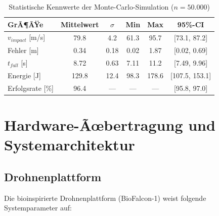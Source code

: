 ﻿\documentclass[12pt,a4paper]{article}
\theoremstyle{remark}
\begin{document}
	\begin{table}[H]
		\centering
		\caption{Statistische Kennwerte der Monte-Carlo-Simulation ($n = 50.000$)}
		\label{tab:statistik}
		\begin{tabular}{lccccc}
			\toprule
			\textbf{GrÃ¶ÃŸe} & \textbf{Mittelwert} & \textbf{$\sigma$} & \textbf{Min} & \textbf{Max} & \textbf{95\%-CI} \\
			\midrule
			$v_{impact}$ [m/s] & 79.8 & 4.2 & 61.3 & 95.7 & [73.1, 87.2] \\
			Fehler [m] & 0.34 & 0.18 & 0.02 & 1.87 & [0.02, 0.69] \\
			$t_{fall}$ [s] & 8.72 & 0.63 & 7.11 & 11.2 & [7.49, 9.96] \\
			Energie [J] & 129.8 & 12.4 & 98.3 & 178.6 & [107.5, 153.1] \\
			Erfolgsrate [\%] & 96.4 & --- & --- & --- & [95.8, 97.0] \\
			\bottomrule
		\end{tabular}
	\end{table}
	
	\section{Hardware-Ãœbertragung und Systemarchitektur}
	\label{sec:hardware}
	
	\subsection{Drohnenplattform}
	
	Die bioinspirierte Drohnenplattform (BioFalcon-1) weist folgende Systemparameter auf:
	
\end{document}

